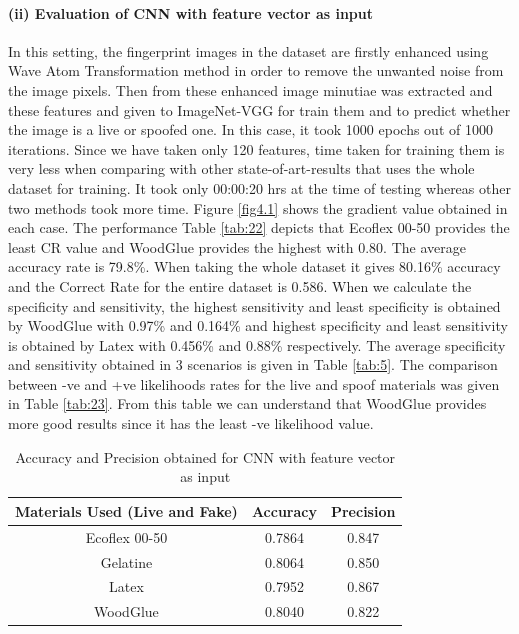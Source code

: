 \textbf{}\paragraph{ (ii) Evaluation of CNN with feature vector as input}
In this setting, the fingerprint images in the dataset are firstly enhanced using Wave Atom Transformation method in order to remove the unwanted noise from the image pixels. Then from these enhanced image minutiae  was extracted and these features and given to ImageNet-VGG for train them and to predict whether the image is a live or spoofed one. In this case, it took 1000 epochs out of 1000 iterations. Since we have taken only  120 features, time taken for training them is very less when comparing with other state-of-art-results that uses the whole dataset for training. It took only 00:00:20 hrs at the time of testing whereas other two methods took more time. Figure \ref{fig4.1} shows the gradient value obtained in each case. The performance Table \ref{tab:22}  depicts that Ecoflex 00-50 provides the least CR value and WoodGlue provides the highest with 0.80. The average accuracy rate is 79.8\%. When taking the whole dataset it gives 80.16\% accuracy and the Correct Rate for the entire dataset is 0.586. When we calculate the specificity and sensitivity, the highest sensitivity and least specificity is obtained by WoodGlue with 0.97\% and 0.164\% and highest specificity and least sensitivity is obtained by Latex with 0.456\% and 0.88\% respectively. The average specificity and sensitivity obtained in 3 scenarios is given in Table \ref{tab:5}. The comparison between -ve and +ve likelihoods rates for the live and spoof materials was given in Table \ref{tab:23}. From this table we can understand that WoodGlue provides more good results since it has the least -ve likelihood value. 

\begin{table}[h]
\caption {Accuracy and Precision obtained for CNN with feature vector as input} \label{tab:2} 
\begin{center}
\begin{tabular}{|c|c|c|} 
 \hline
 Materials Used (Live and Fake) & Accuracy & Precision\\ 
 \hline
 Ecoflex 00-50 & 0.7864 & 0.847\\
 \hline
Gelatine & 0.8064 & 0.850\\
 \hline
Latex & 0.7952 &  0.867\\
\hline
WoodGlue & 0.8040 & 0.822\\
\hline
\end{tabular}
\end{center}
\end{table}

